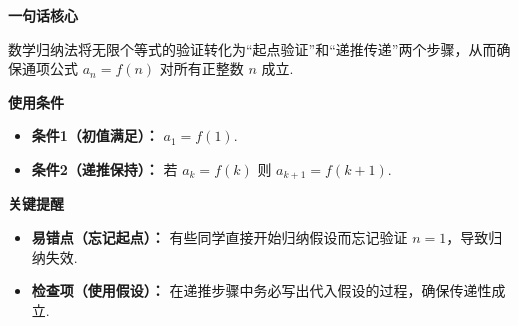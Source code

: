 \begin{summarybox}
	\textbf{\textcolor{CSummary}{一句话核心}}

	数学归纳法将无限个等式的验证转化为“起点验证”和“递推传递”两个步骤，从而确保通项公式 $a_n=f(n)$ 对所有正整数 $n$ 成立.

	\medskip
	\textbf{\textcolor{CSummary}{使用条件}}
	\begin{itemize}[leftmargin=*, itemsep=0.5em, topsep=0.4em]
		\item \textbf{条件1（初值满足）：} $a_1 = f(1)$.
		\item \textbf{条件2（递推保持）：} 若 $a_k = f(k)$ 则 $a_{k+1} = f(k+1)$.
	\end{itemize}

	\medskip
	\textbf{\textcolor{CSummary}{关键提醒}}
	\begin{itemize}[leftmargin=*, itemsep=0.5em, topsep=0.4em]
		\item \textbf{易错点（忘记起点）：} 有些同学直接开始归纳假设而忘记验证 $n=1$，导致归纳失效.
		\item \textbf{检查项（使用假设）：} 在递推步骤中务必写出代入假设的过程，确保传递性成立.
	\end{itemize}
\end{summarybox}
